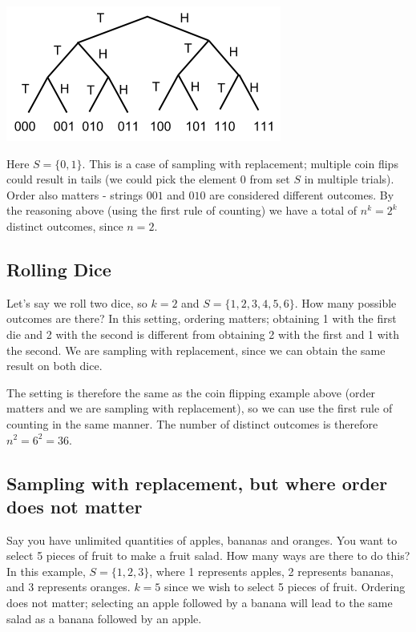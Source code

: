 \documentclass[11pt,fleqn]{article}
\begin{document}
\begin{center}
\includegraphics[scale=.6]{coinflip.png}
\end{center}

Here $S = \{0,1\}$. This is a case of sampling with replacement; multiple coin flips could result in tails (we could pick 
the element 0 from set $S$ in multiple trials). Order also matters - strings $001$
and $010$ are considered different outcomes. By the reasoning above (using the first rule of counting) we have a total 
of $n^k = 2^k$ distinct outcomes, since $n = 2$. 

\subsection*{Rolling Dice}

Let's say we roll two dice, so $k = 2$ and $S = \{1,2,3,4,5,6\}$. How many possible outcomes are there? In this setting, ordering matters;
obtaining 1 with the first die and 2 with the second is different from obtaining 2 with the first and 1 with
the second. We are sampling with replacement, since we can obtain the same result on both dice. 

The setting is therefore the same as the coin flipping example above (order matters and we are sampling 
with replacement), so we can use the first rule of counting in the same manner. 
The number of distinct outcomes is therefore $n^2 = 6^2 = 36$.



\subsection*{Sampling with replacement, but where order does not matter}

Say you have unlimited quantities of apples,
bananas and oranges. You want to select 5 pieces of fruit to make a fruit salad.
How many ways are there to do this? In this example, $S = \{1,2,3\}$, where 1 represents 
apples, 2 represents bananas, and 3 represents oranges. $k = 5$ since we 
wish to select 5 pieces of fruit. Ordering does not matter; selecting an apple
followed by a banana will lead to the same salad as a banana followed by
an apple. 
\end{document}
